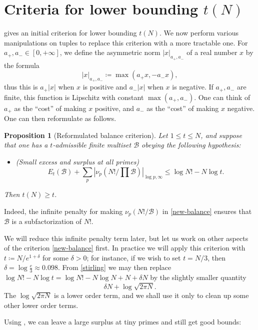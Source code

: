 \documentclass[12pt,a4paper,reqno]{amsart}
\numberwithin{equation}{section}
\theoremstyle{plain}
\newtheorem{proposition}[theorem]{Proposition}
\theoremstyle{definition}
\newcommand\tuple{{\mathcal B}}
\begin{document}
\section{Criteria for lower bounding \texorpdfstring{$t(N)$}{t(N)}}

 gives an initial criterion for lower bounding $t(N)$.  We now perform various manipulations on tuples to replace this criterion with a more tractable one.
For $a_+,a_- \in [0,+\infty]$, we define the asymmetric norm $|x|_{a_+,a_-}$ of a real number $x$ by the formula
$$ |x|_{a_+,a_-} \coloneqq \max(a_+ x, -a_- x),$$
thus this is $a_+ |x|$ when $x$ is positive and $a_- |x|$ when $x$ is negative.  If $a_+,a_-$ are finite, this function is Lipschitz with constant $\max(a_+,a_-)$.  One can think of $a_+$ as the ``cost'' of making $x$ positive, and $a_-$ as the
``cost'' of making $x$ negative.  One can then reformulate  as follows.

\begin{proposition}[Reformulated balance criterion]\label{balance-reform}  Let $1 \leq t \leq N$, and suppose that one has a $t$-admissible finite multiset $\tuple$ obeying the following hypothesis:
  \begin{itemize}
  \item[(i)] (Small excess and surplus at all primes)
  \begin{equation}\label{new-balance}
    E_t(\tuple) + \sum_p |\nu_p(N!/\prod \tuple)|_{\log p,\infty} \leq \log N! - N \log t.
\end{equation}
\end{itemize}
Then $t(N) \geq t$.
\end{proposition}

Indeed, the infinite penalty for making $\nu_p(N!/\tuple)$ in \eqref{new-balance} ensures that $\tuple$ is a subfactorization of $N!$.

We will reduce this infinite penalty term later, but let us work on other aspects of the criterion \eqref{new-balance} first.  In practice we will apply this criterion with $t \coloneqq N / e^{1+\delta}$ for some $\delta>0$; for instance, if we wish to set $t = N/3$, then $\delta = \log \frac{e}{3} \approx 0.098$.  From \eqref{stirling} we may then replace $\log N! - N \log t = \log N! - N \log N + N + \delta N$ by the slightly smaller quantity
$$ \delta N + \log \sqrt{2\pi N}.$$
The $\log \sqrt{2\pi N}$ is a lower order term, and we shall use it only to clean up some other lower order terms.

Using , we can leave a large surplus at tiny primes and still get good bounds:
\end{document}
